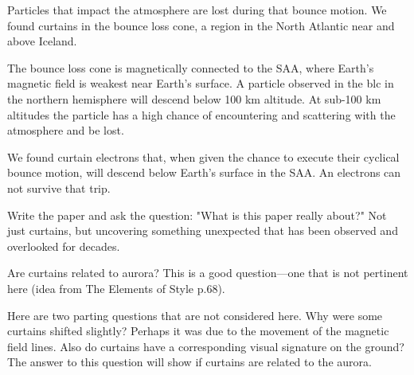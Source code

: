 \documentclass[draft]{agujournal2019}
\begin{document}
Particles that impact the atmosphere are lost during that bounce motion. We found curtains in the bounce loss cone, a region in the North Atlantic near and above Iceland.

The bounce loss cone is magnetically connected to the SAA, where Earth's magnetic field is weakest near Earth's surface. A particle observed in the blc in the northern hemisphere will descend below 100 km altitude. At sub-100 km altitudes the particle has a high chance of encountering and scattering with the atmosphere and be lost. 

We found curtain electrons that, when given the chance to execute their cyclical bounce motion, will descend below Earth's surface in the SAA. An electrons can not survive that trip.

Write the paper and ask the question: "What is this paper really about?" Not just curtains, but uncovering something unexpected that has been observed and overlooked for decades.

Are curtains related to aurora? This is a good question---one that is not pertinent here (idea from The Elements of Style p.68).

Here are two parting questions that are not considered here. Why were some curtains shifted slightly? Perhaps it was due to the movement of the magnetic field lines. Also do curtains have a corresponding visual signature on the ground? The answer to this question will show if curtains are related to the aurora.


%
\end{document}
